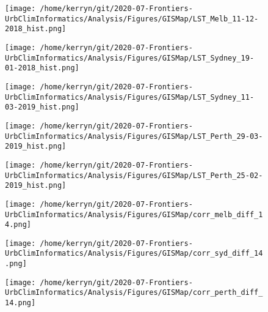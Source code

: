 \documentclass{article}
\begin{document}
\begin{figure} %
\texttt{[image: /home/kerryn/git/2020-07-Frontiers-UrbClimInformatics/Analysis/Figures/GISMap/LST\_Melb\_11-12-2018\_hist.png]}
\end{figure} 
\clearpage

\begin{figure} %
\texttt{[image: /home/kerryn/git/2020-07-Frontiers-UrbClimInformatics/Analysis/Figures/GISMap/LST\_Sydney\_19-01-2018\_hist.png]}
\end{figure} 
\clearpage

\begin{figure} %
\texttt{[image: /home/kerryn/git/2020-07-Frontiers-UrbClimInformatics/Analysis/Figures/GISMap/LST\_Sydney\_11-03-2019\_hist.png]}
\end{figure} 
\clearpage

\begin{figure} %
\texttt{[image: /home/kerryn/git/2020-07-Frontiers-UrbClimInformatics/Analysis/Figures/GISMap/LST\_Perth\_29-03-2019\_hist.png]}
\end{figure} 
\clearpage

\begin{figure}  %
\texttt{[image: /home/kerryn/git/2020-07-Frontiers-UrbClimInformatics/Analysis/Figures/GISMap/LST\_Perth\_25-02-2019\_hist.png]}
\end{figure} 
\clearpage

\begin{figure} %
\texttt{[image: /home/kerryn/git/2020-07-Frontiers-UrbClimInformatics/Analysis/Figures/GISMap/corr\_melb\_diff\_14.png]}
\end{figure} 
\clearpage

\begin{figure} %
\texttt{[image: /home/kerryn/git/2020-07-Frontiers-UrbClimInformatics/Analysis/Figures/GISMap/corr\_syd\_diff\_14.png]}
\end{figure} 
\clearpage

\begin{figure} %
\texttt{[image: /home/kerryn/git/2020-07-Frontiers-UrbClimInformatics/Analysis/Figures/GISMap/corr\_perth\_diff\_14.png]}
\end{figure} 
\clearpage
\end{document}
